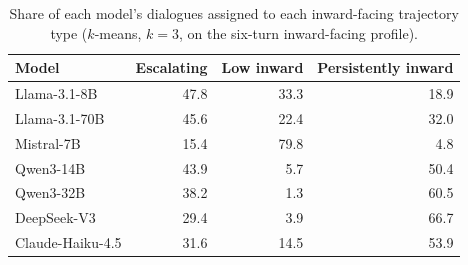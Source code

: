 \begin{table}[t]
\centering
\small
\caption{Share of each model's dialogues assigned to each inward-facing trajectory type ($k$-means, $k=3$, on the six-turn inward-facing profile).}
\label{tab:trajectories}
\begin{tabular}{lrrr}
\toprule
Model & Escalating & Low inward & Persistently inward \\
\midrule
Llama-3.1-8B & 47.8 & 33.3 & 18.9 \\
Llama-3.1-70B & 45.6 & 22.4 & 32.0 \\
Mistral-7B & 15.4 & 79.8 & 4.8 \\
Qwen3-14B & 43.9 & 5.7 & 50.4 \\
Qwen3-32B & 38.2 & 1.3 & 60.5 \\
DeepSeek-V3 & 29.4 & 3.9 & 66.7 \\
Claude-Haiku-4.5 & 31.6 & 14.5 & 53.9 \\
\bottomrule
\end{tabular}
\end{table}
